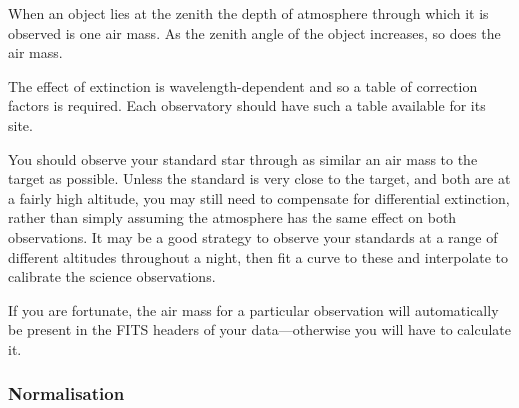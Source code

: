 \documentclass[twoside,11pt]{starlink}
\providecommand{\mlabel}[1]{\xlabel{#1}\label{#1}}
\providecommand{\scspec}[2]{#1}
\begin{document}
When an object lies at the zenith the depth of atmosphere
through which it is observed is one air mass.
As the zenith angle of the object increases, so does the air mass.

The effect of extinction is wavelength-dependent and so a table of
correction factors is required.
Each observatory should have such a table available for its site.

You should observe your standard star through as similar an air mass
to the target as possible.  Unless the standard is very close to the
target, and both are at a fairly high altitude, you may still need to
compensate for differential extinction, rather than simply assuming the
atmosphere has the same effect on both observations.  It may be a good
strategy to observe your standards at a range of different altitudes
throughout a night, then fit a curve to these and interpolate to
calibrate the science observations.

If you are fortunate, the air mass for a particular observation will
automatically be present in the FITS headers of your
data\scspec{---}{ - }otherwise you will have to calculate it.


\subsubsection{\mlabel{normalisation}Normalisation}
\end{document}
